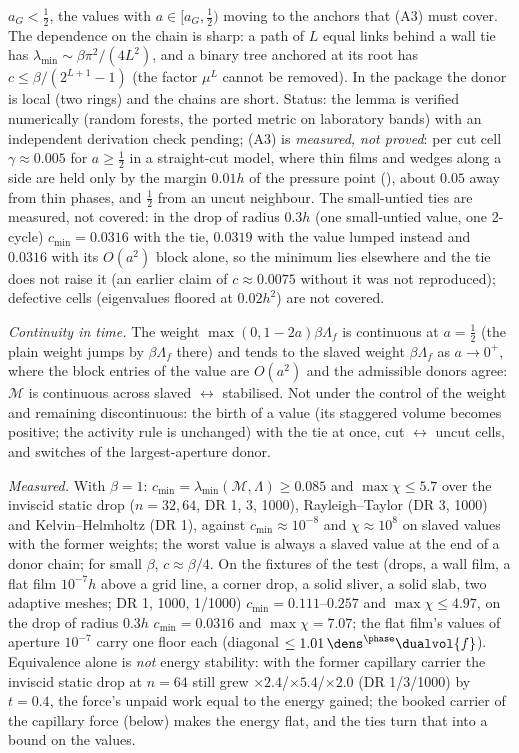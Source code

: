 $a_G<\tfrac12$, the values with $a\in[a_G,\tfrac12)$ moving to the anchors that
(A3) must cover. The dependence on the chain is sharp: a path of $L$ equal
links behind a wall tie has $\lambda_{\min}\sim\beta\pi^2/(4L^2)$, and a binary
tree anchored at its root has $c\le\beta/(2^{L+1}-1)$ (the factor $\mu^L$ cannot
be removed). In the package the donor is local (two rings) and the chains are
short. Status: the lemma is verified numerically (random forests, the ported
metric on laboratory bands) with an independent derivation check pending;
(A3) is \emph{measured, not proved}: per cut cell $\gamma\approx0.005$ for
$a\ge\tfrac12$ in a straight-cut model, where thin films and wedges along a
side are held only by the margin $0.01h$ of the pressure point
(), about $0.05$ away from thin phases, and
$\tfrac12$ from an uncut neighbour. The small-untied ties are measured, not
covered: in the drop of radius $0.3h$ (one small-untied value, one 2-cycle)
$c_{\min}=0.0316$ with the tie, $0.0319$ with the value lumped instead and
$0.0316$ with its $O(a^2)$ block alone, so the minimum lies elsewhere and the
tie does not raise it (an earlier claim of $c\approx0.0075$ without it was not
reproduced); defective cells (eigenvalues floored at $0.02h^2$) are not covered.

\emph{Continuity in time.} The weight $\max(0,1-2a)\beta\Lambda_f$ is continuous
at $a=\tfrac12$ (the plain weight jumps by $\beta\Lambda_f$ there) and tends to
the slaved weight $\beta\Lambda_f$ as $a\to0^+$, where the block entries of the
value are $O(a^2)$ and the admissible donors agree: $\mathcal M$ is continuous
across slaved $\leftrightarrow$ stabilised. Not under the control of the
weight and remaining discontinuous: the birth of a value (its staggered
volume becomes positive; the activity rule is unchanged) with the tie at once,
cut $\leftrightarrow$ uncut cells, and switches of the largest-aperture donor.

\emph{Measured.} With $\beta=1$: $c_{\min}=\lambda_{\min}(\mathcal M,\Lambda)\ge0.085$
and $\max\chi\le5.7$ over the inviscid static drop ($n=32,64$, DR 1, 3, 1000),
Rayleigh--Taylor (DR 3, 1000) and Kelvin--Helmholtz (DR 1), against
$c_{\min}\approx10^{-8}$ and $\chi\approx10^8$ on slaved values with the former
weights; the worst value is always a slaved value at the end of a donor chain;
for small $\beta$, $c\approx\beta/4$. On the fixtures of the test (drops, a wall
film, a flat film $10^{-7}h$ above a grid line, a corner drop, a solid sliver,
a solid slab, two adaptive meshes; DR 1, 1000, 1/1000) $c_{\min}=0.111$--$0.257$
and $\max\chi\le4.97$, on the drop of radius $0.3h$ $c_{\min}=0.0316$ and
$\max\chi=7.07$; the flat film's values of aperture $10^{-7}$ carry one floor
each (diagonal $\le1.01\,\dens^{\phase}\dualvol{f}$). Equivalence alone is
\emph{not} energy stability: with the former capillary carrier the inviscid
static drop at $n=64$ still grew $\times2.4$/$\times5.4$/$\times2.0$ (DR 1/3/1000)
by $t=0.4$, the force's unpaid work equal to the energy gained; the booked
carrier of the capillary force (below) makes the energy flat, and the ties turn
that into a bound on the values.


